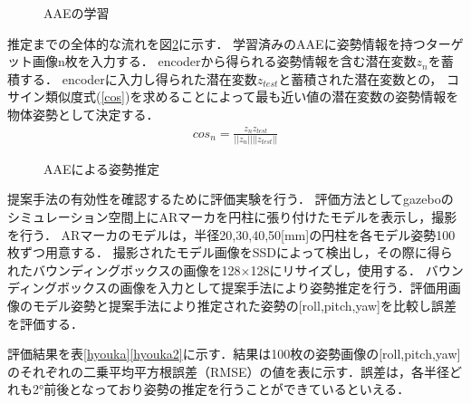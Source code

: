 \documentclass{jsarticle}
\begin{document}
\begin{figure}[ht]
\vspace{-7zh}
\setlength{\epsfxsize}{7.5cm}
\centerline{}
\vspace{5zh}
\caption{AAEの学習}
\label{BB}
\vspace{-1.0zh}
\end{figure}




推定までの全体的な流れを図\ref{GG}に示す．
学習済みのAAEに姿勢情報を持つターゲット画像n枚を入力する．
encoderから得られる姿勢情報を含む潜在変数$z_n$を蓄積する．
encoderに入力し得られた潜在変数$z_{test}$と蓄積された潜在変数との，
コサイン類似度式(\ref{cos})を求めることによって最も近い値の潜在変数の姿勢情報を物体姿勢として決定する．
\begin{eqnarray}
\label{cos}
cos_n=\frac{z_n z_{test}}{||z_n|| ||z_{test}||}
\end{eqnarray}


\begin{figure}[ht]
\vspace{-5zh}
\setlength{\epsfxsize}{7.5cm}
\centerline{}
\vspace{5zh}
\caption{AAEによる姿勢推定}
\label{GG}
\vspace{-1.0zh}
\end{figure}





提案手法の有効性を確認するために評価実験を行う．
評価方法としてgazeboのシミュレーション空間上にARマーカを円柱に張り付けたモデルを表示し，撮影を行う．
ARマーカのモデルは，半径20,30,40,50[mm]の円柱を各モデル姿勢100枚ずつ用意する．
撮影されたモデル画像をSSDによって検出し，その際に得られたバウンディングボックスの画像を128$\times$128にリサイズし，使用する．
バウンディングボックスの画像を入力として提案手法により姿勢推定を行う．評価用画像のモデル姿勢と提案手法により推定された姿勢の[roll,pitch,yaw]を比較し誤差を評価する．

評価結果を表\ref{hyouka}\ref{hyouka2}に示す．結果は100枚の姿勢画像の[roll,pitch,yaw]のそれぞれの二乗平均平方根誤差（RMSE）の値を表に示す．誤差は，各半径どれも2°前後となっており姿勢の推定を行うことができているといえる．
\end{document}
